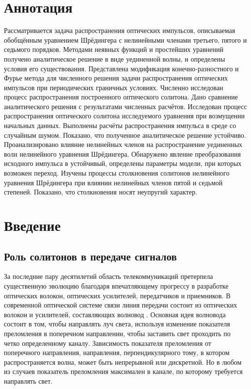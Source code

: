 \documentclass[14pt,a4paper]{extreport}
\begin{document}
	\newpage
	\section*{Аннотация}
		Рассматривается задача распространения оптических импульсов, описываемая обобщённым уравнением Шрёдингера с нелинейными членами третьего, пятого и седьмого порядков. Методами неявных функций и простейших уравнений получено аналитическое решение в виде уединенной волны, и определены условия его существования. Представлена модификация конечно-разностного и Фурье метода для численного решения задачи распространения оптических импульсов при периодических граничных условиях. Численно исследован процесс распространения построенного оптического солитона. Дано сравнение аналитического решения с результатами численных расчётов. Исследован процесс распространения оптического солитона исследуемого уравнения при возмущении начальных данных. Выполнены расчёты распространения импульса в среде со случайным шумом. Показано, что полученное аналитическое решение устойчиво. Проанализировано влияние нелинейных членов на распространение уединенных волн нелинейного уравнения Шрёдингера. Обнаружено явление преобразования исходного импульса в устойчивый, определены параметры модели, при которых возможен переход. Изучены процессы столкновения солитонов нелинейного уравнения Шрёдингера при влиянии нелинейных членов пятой и седьмой степеней. Показано, что столкновения носят неупругий характер.

	\newpage
		\tableofcontents
	\newpage

	\section{Введение}\label{Introduction}\label{ch100}
		\subsection{Роль солитонов в передаче сигналов}\label{ch110}
			За последние пару десятилетий область телекоммуникаций претерпела существенную эволюцию благодаря впечатляющему прогрессу в разработке оптических волокон, оптических усилителей, передатчиков и приемников. В современной оптической системе связи линия передачи состоит из оптических волокон и усилителей, составляющих волновод \cite{Rad1}. Основная идея волновода состоит в том, чтобы направлять луч света, используя изменение показателя преломления в поперечном направлении, чтобы заставить свет проходить по четко определенному каналу. Зависимость показателя преломления от поперечного направления, направления, перпендикулярного тому, в котором распространяется волна, может быть непрерывной или дискретной. Но в любом из случаев показатель преломления максимален в канале, по которому требуется направлять свет. \\
\end{document}

